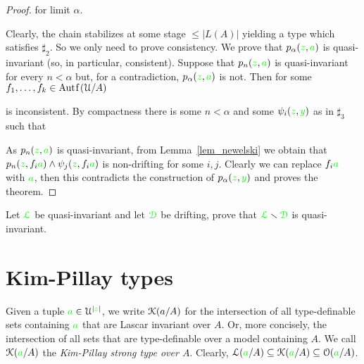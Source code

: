 \documentclass[creche.tex]{subfiles}
\begin{document}
\begin{proof}
\quad for limit $\alpha$.

\noindent Clearly, the chain stabilizes at some stage $\le|L(A)|$ yielding a type which satisfies $\sharp_2$. So we only need to prove consistency. We prove that $p_\alpha({\color{green} z},{\color{green} a})$ is quasi-invariant (so, in particular, consistent). Suppose that $p_n({\color{green} z},{\color{green} a})$ is quasi-invariant for every $n<\alpha$ but, for a contradiction, $p_\alpha({\color{green} z},{\color{green} a})$ is not. Then for some $f_1,\dots,f_k\in\mathord{\rm Aut\kern.15ex{f}\kern.15ex}(\EuScript U/A)$


\noindent is inconsistent. By compactness there is some $n<\alpha$ and some $\psi_i({\color{green} z},{\color{green} y})$ as in $\sharp_3$ such that


As $p_n({\color{green} z},{\color{green} a})$ is quasi-invariant, from Lemma~\ref{lem_newelski} we obtain that $p_n({\color{green} z},f_i{\color{green} a})\wedge\psi_j({\color{green} z},f_i{\color{green} a})$ is non-drifting for some $i,j$. Clearly we can replace $f_i{\color{green} a}$ with ${\color{green} a}$, then this contradicts the construction of $p_\alpha({\color{green} z},{\color{green} y})$ and proves the theorem.
\end{proof}

\begin{exercise}
Let ${\color{green}\EuScript L}$ be quasi-invariant and let ${\color{green}\EuScript D}$ be drifting, prove that  ${\color{green}\EuScript L}\smallsetminus{\color{green}\EuScript D}$ is quasi-invariant.\QED
\end{exercise}

\section{Kim-Pillay types}\label{KPtypes}


Given a tuple ${\color{green} a}\in\EuScript U^{|{\color{green} z}|}$, we write \emph{$\EuScript K(a/A)$\/} for the intersection of all type-definable sets containing ${\color{green} a}$ that are Lascar invariant over $A$. Or, more concisely, the intersection of all sets that are type-definable over a model containing $A$. We call $\EuScript K({\color{green} a}/A)$ the \emph{Kim-Pillay strong type over $A$}. Clearly,  $\EuScript L({\color{green} a}/A)\subseteq\EuScript K({\color{green} a}/A)\subseteq\EuScript O({\color{green} a}/A)$. 
\end{document}

